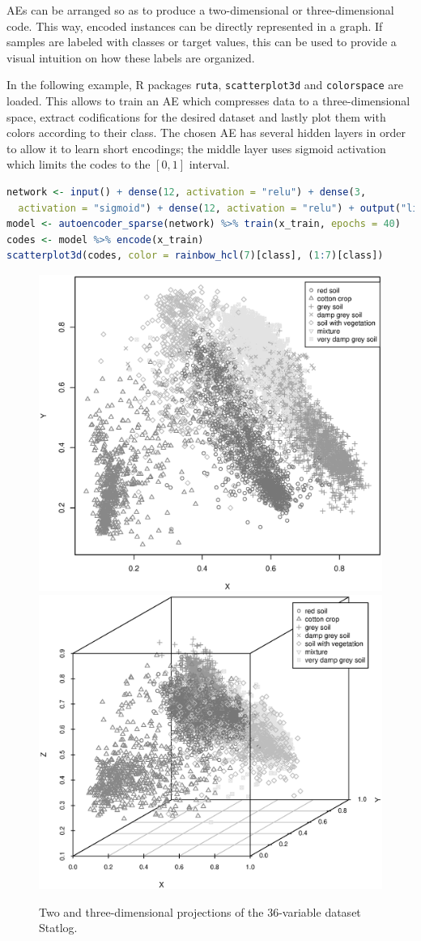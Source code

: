 AEs can be arranged so as to produce a two-dimensional or three-dimensional code. This way, encoded instances can be directly represented in a graph. If samples are labeled with classes or target values, this can be used to provide a visual intuition on how these labels are organized. 

In the following example, R packages \texttt{ruta}, \texttt{scatterplot3d} and \texttt{colorspace} are loaded. This allows to train an AE which compresses data to a three-dimensional space, extract codifications for the desired dataset and lastly plot them with colors according to their class. The chosen AE has several hidden layers in order to allow it to learn short encodings; the middle layer uses sigmoid activation which limits the codes to the $[0,1]$ interval.

\begin{lstlisting}[language=R]
network <- input() + dense(12, activation = "relu") + dense(3, 
  activation = "sigmoid") + dense(12, activation = "relu") + output("linear")
model <- autoencoder_sparse(network) %>% train(x_train, epochs = 40)
codes <- model %>% encode(x_train)
scatterplot3d(codes, color = rainbow_hcl(7)[class], (1:7)[class])
\end{lstlisting}

\begin{figure}[ht]
    \centering
    \includegraphics[width=.49\textwidth]{visualization_sat2.eps}
    \includegraphics[width=.49\textwidth]{visualization_sat3.eps}
    \caption{Two and three-dimensional projections of the 36-variable dataset Statlog.}
    \label{p4fig:visualization}
\end{figure}

